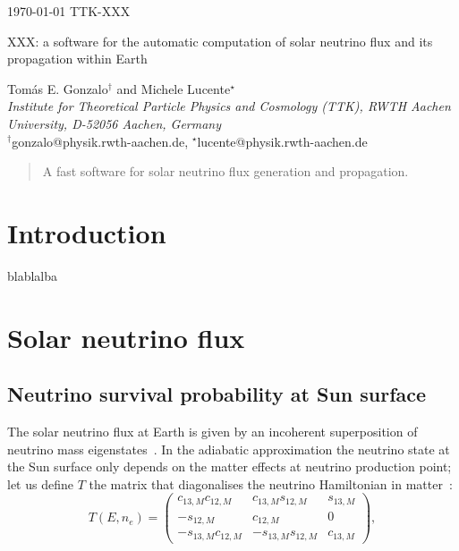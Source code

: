 \documentclass[11pt,a4paper]{article}
\begin{document}
\noindent \today
\hfill TTK-XXX

\vskip 0.4cm

\begin{center}
\bigskip
{\huge\bf
\begin{spacing}{1.1}
XXX: a software for the automatic computation of solar neutrino flux and its propagation within Earth
\end{spacing}
}

\vskip 0.4cm

\renewcommand*{\thefootnote}{\fnsymbol{footnote}}
{\large
Tomás E. Gonzalo$^{\dagger}$ and Michele Lucente$^{\star}$
\\[3mm]
{\it{
Institute for Theoretical Particle Physics and Cosmology (TTK), RWTH Aachen University, D-52056 Aachen, Germany}
}}
\\[3mm]
{$^{\dagger}$gonzalo@physik.rwth-aachen.de, $^{\star}$lucente@physik.rwth-aachen.de}
\end{center}
\vskip 0.4cm

\renewcommand*{\thefootnote}{\arabic{footnote}}
\setcounter{footnote}{0}

\begin{abstract}
A fast software for solar neutrino flux generation and propagation.	
\end{abstract}

\thispagestyle{empty}

\begin{small}
\tableofcontents
\end{small}

\newpage


\section{Introduction}
blablalba

\section{Solar neutrino flux}
	\subsection{Neutrino survival probability at Sun surface}
The solar neutrino flux at Earth is given by an incoherent superposition of neutrino mass eigenstates~\cite{Mikheev:1987wa, Lisi:1997yc}. In the adiabatic approximation the neutrino state at the Sun surface only depends on the matter effects at neutrino production point; let us define $T$ the matrix that diagonalises the neutrino Hamiltonian in matter~\cite{FiuzadeBarros:2011qna}:
\begin{equation}
	T\left(E, n_e\right) =\left( \begin{array}{ccc}
		c_{13, M} c_{12, M} & c_{13,M} s_{12, M} & s_{13, M} \\
		-s_{12, M} & c_{12,M} & 0 \\
		-s_{13,M} c_{12,M} & -s_{13,M} s_{12,M} & c_{13, M}
	\end{array}
	\right),
\end{equation}
	
\end{document}
